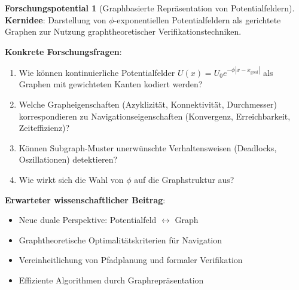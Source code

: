 ﻿\documentclass[a4paper,12pt]{article}
\theoremstyle{definition}
\newtheorem{potential}{Forschungspotential}[section]
\begin{document}
\begin{potential}[Graphbasierte Repräsentation von Potentialfeldern]
\textbf{Kernidee}: Darstellung von $\phi$-exponentiellen Potentialfeldern als gerichtete Graphen zur Nutzung graphtheoretischer Verifikationstechniken.

\textbf{Konkrete Forschungsfragen}:
\begin{enumerate}
	\item Wie können kontinuierliche Potentialfelder $U(x) = U_0 e^{-\phi |x - x_{\text{goal}}|}$ als Graphen mit gewichteten Kanten kodiert werden?
	\item Welche Grapheigenschaften (Azyklizität, Konnektivität, Durchmesser) korrespondieren zu Navigationseigenschaften (Konvergenz, Erreichbarkeit, Zeiteffizienz)?
	\item Können Subgraph-Muster unerwünschte Verhaltensweisen (Deadlocks, Oszillationen) detektieren?
	\item Wie wirkt sich die Wahl von $\phi$ auf die Graphstruktur aus?
\end{enumerate}

\textbf{Erwarteter wissenschaftlicher Beitrag}:
\begin{itemize}
	\item Neue duale Perspektive: Potentialfeld $\leftrightarrow$ Graph
	\item Graphtheoretische Optimalitätskriterien für Navigation
	\item Vereinheitlichung von Pfadplanung und formaler Verifikation
	\item Effiziente Algorithmen durch Graphrepräsentation
\end{itemize}
\end{potential}
\end{document}
